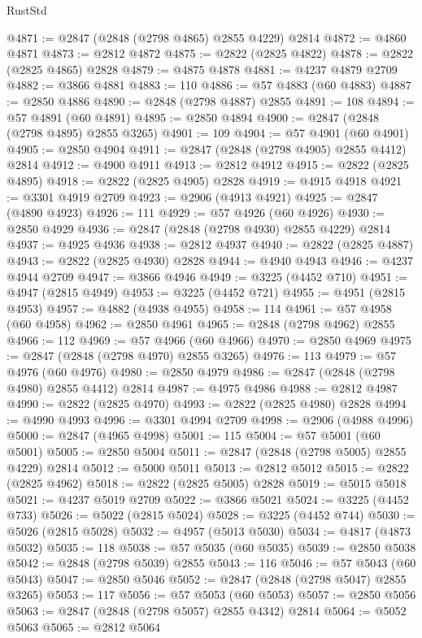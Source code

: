 \begin{lexlean}{RustStd}
\begin{coremodule}
@4871 := @2847 (@2848 (@2798 @4865) @2855 @4229) @2814
@4872 := @4860 @4871
@4873 := @2812 @4872
@4875 := @2822 (@2825 @4822)
@4878 := @2822 (@2825 @4865) @2828
@4879 := @4875 @4878
@4881 := @4237 @4879 @2709
@4882 := @3866 @4881
@4883 := 110
@4886 := @57 @4883 (@60 @4883)
@4887 := @2850 @4886
@4890 := @2848 (@2798 @4887) @2855
@4891 := 108
@4894 := @57 @4891 (@60 @4891)
@4895 := @2850 @4894
@4900 := @2847 (@2848 (@2798 @4895) @2855 @3265)
@4901 := 109
@4904 := @57 @4901 (@60 @4901)
@4905 := @2850 @4904
@4911 := @2847 (@2848 (@2798 @4905) @2855 @4412) @2814
@4912 := @4900 @4911
@4913 := @2812 @4912
@4915 := @2822 (@2825 @4895)
@4918 := @2822 (@2825 @4905) @2828
@4919 := @4915 @4918
@4921 := @3301 @4919 @2709
@4923 := @2906 (@4913 @4921)
@4925 := @2847 (@4890 @4923)
@4926 := 111
@4929 := @57 @4926 (@60 @4926)
@4930 := @2850 @4929
@4936 := @2847 (@2848 (@2798 @4930) @2855 @4229) @2814
@4937 := @4925 @4936
@4938 := @2812 @4937
@4940 := @2822 (@2825 @4887)
@4943 := @2822 (@2825 @4930) @2828
@4944 := @4940 @4943
@4946 := @4237 @4944 @2709
@4947 := @3866 @4946
@4949 := @3225 (@4452 @710)
@4951 := @4947 (@2815 @4949)
@4953 := @3225 (@4452 @721)
@4955 := @4951 (@2815 @4953)
@4957 := @4882 (@4938 @4955)
@4958 := 114
@4961 := @57 @4958 (@60 @4958)
@4962 := @2850 @4961
@4965 := @2848 (@2798 @4962) @2855
@4966 := 112
@4969 := @57 @4966 (@60 @4966)
@4970 := @2850 @4969
@4975 := @2847 (@2848 (@2798 @4970) @2855 @3265)
@4976 := 113
@4979 := @57 @4976 (@60 @4976)
@4980 := @2850 @4979
@4986 := @2847 (@2848 (@2798 @4980) @2855 @4412) @2814
@4987 := @4975 @4986
@4988 := @2812 @4987
@4990 := @2822 (@2825 @4970)
@4993 := @2822 (@2825 @4980) @2828
@4994 := @4990 @4993
@4996 := @3301 @4994 @2709
@4998 := @2906 (@4988 @4996)
@5000 := @2847 (@4965 @4998)
@5001 := 115
@5004 := @57 @5001 (@60 @5001)
@5005 := @2850 @5004
@5011 := @2847 (@2848 (@2798 @5005) @2855 @4229) @2814
@5012 := @5000 @5011
@5013 := @2812 @5012
@5015 := @2822 (@2825 @4962)
@5018 := @2822 (@2825 @5005) @2828
@5019 := @5015 @5018
@5021 := @4237 @5019 @2709
@5022 := @3866 @5021
@5024 := @3225 (@4452 @733)
@5026 := @5022 (@2815 @5024)
@5028 := @3225 (@4452 @744)
@5030 := @5026 (@2815 @5028)
@5032 := @4957 (@5013 @5030)
@5034 := @4817 (@4873 @5032)
@5035 := 118
@5038 := @57 @5035 (@60 @5035)
@5039 := @2850 @5038
@5042 := @2848 (@2798 @5039) @2855
@5043 := 116
@5046 := @57 @5043 (@60 @5043)
@5047 := @2850 @5046
@5052 := @2847 (@2848 (@2798 @5047) @2855 @3265)
@5053 := 117
@5056 := @57 @5053 (@60 @5053)
@5057 := @2850 @5056
@5063 := @2847 (@2848 (@2798 @5057) @2855 @4342) @2814
@5064 := @5052 @5063
@5065 := @2812 @5064

\end{coremodule}
\end{lexlean}
